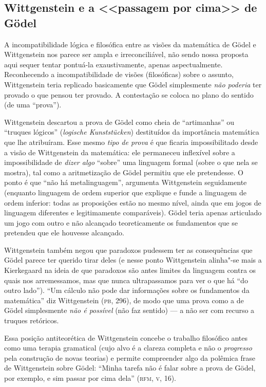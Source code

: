 {\subsection{Wittgenstein e a <<passagem por
cima>> de Gödel}

A incompatibilidade lógica e filosófica entre as visões da
matemática de Gödel e Wittgenstein nos parece ser ampla e
irreconciliável, não sendo nossa proposta aqui sequer tentar
pontuá-la exaustivamente, apenas aspectualmente. Reconhecendo a
incompatibilidade de visões (filosóficas) sobre o assunto,
Wittgenstein teria replicado basicamente que Gödel simplesmente
\emph{não poderia} ter provado o que pensou ter provado. A
contestação se coloca no plano do sentido (de uma ``prova'').

Wittgenstein descartou a prova de Gödel como cheia de
“artimanhas” ou “truques lógicos” (\emph{logische
Kunststücken}) destituídos da importância matemática que lhe
atribuíram. Esse mesmo \emph{tipo de prova} é que ficaria
impossibilitado desde a visão de Wittgenstein da matemática: ele
permaneceu inflexível sobre a impossibilidade de \emph{dizer
algo} ``sobre'' uma linguagem
formal (sobre o que nela se mostra), tal como a aritmetização de
Gödel permitiu que ele pretendesse. O ponto é que “não há
metalinguagem”, argumenta Wittgenstein seguidamente (enquanto
linguagem de ordem superior que explique e funde a linguagem de
ordem inferior: todas as proposições estão no mesmo nível, ainda
que em jogos de linguagem diferentes e legitimamente
comparáveis). Gödel teria apenas articulado um jogo com outro e
não alcançado teoreticamente os fundamentos que se pretendeu que
ele houvesse alcançado.

Wittgenstein também negou que paradoxos pudessem ter as
consequências que Gödel parece ter querido tirar deles (e nesse
ponto Wittgenstein alinha"-se mais a Kierkegaard na ideia de que
paradoxos são antes limites da linguagem contra os quais nos
arremessamos, mas que nunca ultrapassamos para ver o que há
``do outro lado''). “Um cálculo
não pode dar informações sobre os fundamentos da matemática” diz
Wittgenstein (\textsc{pb}, 296), de modo que uma prova como a de Gödel
simplesmente \emph{não é possível} (não faz sentido) --- a não
ser com recurso a truques retóricos.

Essa posição antiteorética de Wittgenstein concebe o trabalho
filosófico antes como uma terapia gramatical (cujo alvo é a
clareza completa e não o \emph{progresso} pela construção de
novas teorias) e permite compreender algo da polêmica frase de
Wittgenstein sobre Gödel: “Minha tarefa não é falar sobre a
prova de Gödel, por exemplo, e sim passar por cima dela” (\textsc{rfm},
\textsc{v}, 16).

}
